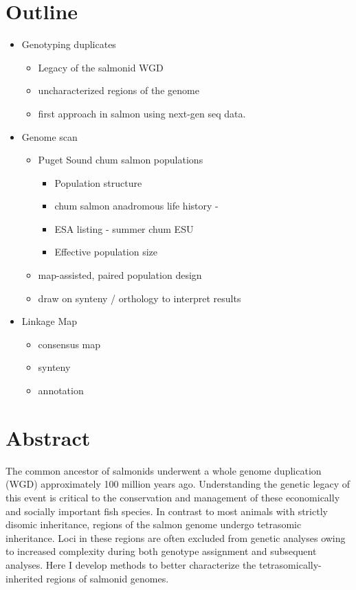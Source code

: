 \documentclass[12pt, one column]{article}
\begin{document}
\section*{Outline}
\begin{itemize}

\item Genotyping duplicates
\begin{itemize}
\item Legacy of the salmonid WGD
\item uncharacterized regions of the genome 
\item first approach in salmon using next-gen seq data.
\end{itemize}

\item Genome scan
\begin{itemize}
\item Puget Sound chum salmon populations
\begin{itemize}
\item Population structure
\item chum salmon anadromous life history - 
\item ESA listing - summer chum ESU
\item Effective population size
\end{itemize}

\item map-assisted, paired population design
\item draw on synteny / orthology to interpret results
\end{itemize}

\item Linkage Map
\begin{itemize}
\item consensus map
\item synteny
\item annotation
\end{itemize}

\end{itemize}


\pagebreak

\section*{Abstract}
The common ancestor of salmonids underwent a whole genome duplication (WGD) approximately 100 million years ago. Understanding the genetic legacy of this event is critical to the conservation and management of these economically and socially important fish species. In contrast to most animals with strictly disomic inheritance, regions of the salmon genome undergo tetrasomic inheritance.  Loci in these regions are often excluded from genetic analyses owing to increased complexity during both genotype assignment and subsequent analyses. Here I develop methods to better characterize the tetrasomically-inherited regions of salmonid genomes.
\end{document}
